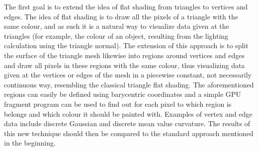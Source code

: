 \label{section:vertex-area-chapter}
The first goal is to extend the idea of flat shading from triangles to vertices and edges. The idea of flat shading is to draw all the pixels of a triangle with the same colour, and as such it is a natural way to visualize data given at the triangles (for example, the colour of an object, resulting from the lighting calculation using the triangle normal). The extension of this approach is to split the surface of the triangle mesh likewise into regions around vertices and edges and draw all pixels in these regions with the same colour, thus visualizing data given at the vertices or edges of the mesh in a piecewise constant, not necessarily continuous way, resembling the classical triangle flat shading. The aforementioned regions can easily be defined using barycentric coordinates and a simple GPU fragment program can be used to find out for each pixel to which region is belongs and which colour it should be painted with. Examples of vertex and edge data include discrete Gaussian and discrete mean value curvature. The results of this new technique should then be compared to the standard approach mentioned in the beginning.




